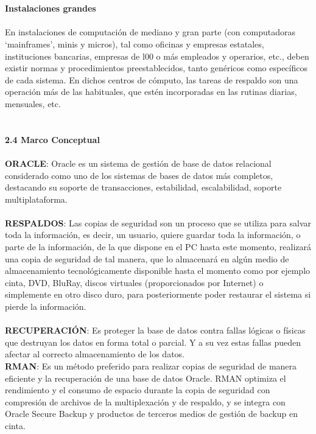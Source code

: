 \begin{enumerate}[3.1.]
\\
\\
\textbf{Instalaciones grandes}
\\
\\En instalaciones de computación de mediano y gran parte (con computadoras ‘mainframes’, minis y micros), tal como oficinas y empresas estatales, instituciones bancarias, empresas de l00 o más empleados y operarios, etc., deben existir normas y procedimientos preestablecidos, tanto genéricos como específicos de cada sistema. En dichos centros de cómputo, las tareas de respaldo son una operación más de las habituales, que estén incorporadas en las rutinas diarias, mensuales, etc.
\\
\\
\\
\textbf{2.4 Marco Conceptual}
\\
\\
\textbf{ORACLE}: Oracle es un sistema de gestión de base de datos relacional considerado como uno de los sistemas de bases de datos más completos, destacando su soporte de transacciones, estabilidad, escalabilidad, soporte multiplataforma.
\\
\\
\textbf{RESPALDOS}: Las copias de seguridad son un proceso que se utiliza para salvar toda la información, es decir, un usuario, quiere guardar toda la información, o parte de la información, de la que dispone en el PC hasta este momento, realizará una copia de seguridad de tal manera, que lo almacenará en algún medio de almacenamiento tecnológicamente disponible hasta el momento como por ejemplo cinta, DVD, BluRay, discos virtuales (proporcionados por Internet) o simplemente en otro disco duro, para posteriormente poder restaurar el sistema si pierde la información.
\\
\\
\textbf{RECUPERACIÓN}: Es proteger la base de datos contra fallas lógicas o físicas que destruyan los datos en forma total o parcial. Y a su vez estas fallas pueden afectar al correcto almacenamiento de los datos.
\\
\textbf{RMAN}: Es un método preferido para realizar copias de seguridad de manera eficiente y la recuperación de una base de datos Oracle. RMAN optimiza el rendimiento y el consumo de espacio durante la copia de seguridad con compresión de archivos de la multiplexación y de respaldo, y se integra con Oracle Secure Backup y productos de terceros medios de gestión de backup en cinta.
\\

\end{enumerate}
